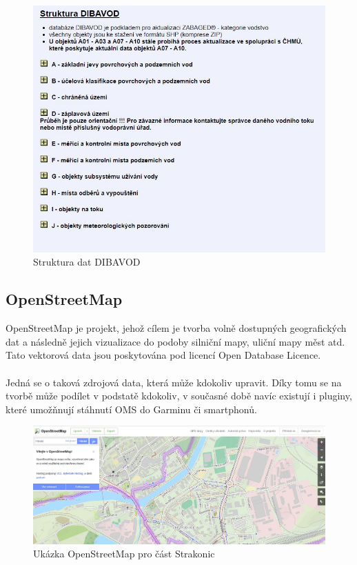 \documentclass[a4paper, 12pt]{article}
\begin{document}
\begin{figure}[h!]
	\centering
	\includegraphics[width=13cm]{pictures/dibavod.jpg}
	\caption{Struktura dat DIBAVOD}
\end{figure}

\subsection{OpenStreetMap}
OpenStreetMap je projekt, jehož cílem je tvorba volně dostupných geografických dat a následně jejich vizualizace do podoby silniční mapy, uliční mapy měst atd. Tato vektorová data jsou poskytována pod licencí Open Database Licence. \\
\\
Jedná se o taková zdrojová data, která může kdokoliv upravit. Díky tomu se na tvorbě může podílet v podstatě kdokoliv, v současné době navíc existují i pluginy, které umožňnují stáhnutí OMS do Garminu či smartphonů. 

\begin{figure}[h!]
	\centering
	\includegraphics[width=14cm]{pictures/osm.jpg}
	\caption{Ukázka OpenStreetMap pro část Strakonic}
\end{figure}
\end{document}
